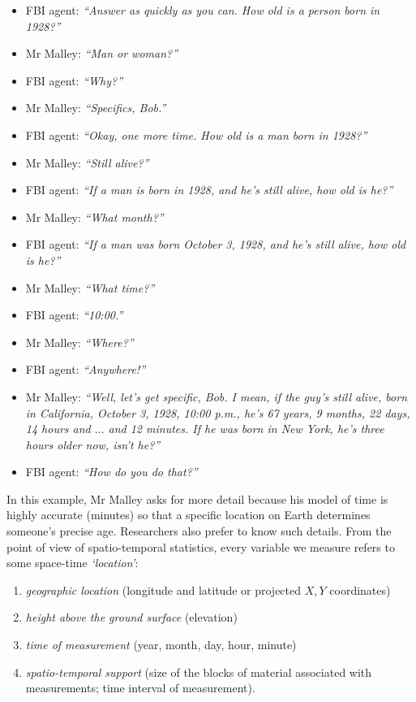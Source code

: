 \documentclass[graybox,envcountchap,sectrefs,UStrade]{svmono}
\begin{document}
\begin{itemize}\renewcommand{\labelitemi}{$\blacktriangleright$}
  \item FBI agent: \emph{``Answer as quickly as you can. How old is a person born in 1928?''}
  \item Mr Malley: \emph{``Man or woman?''}
  \item FBI agent: \emph{``Why?''}
  \item Mr Malley: \emph{``Specifics, Bob.''}
  \item FBI agent: \emph{``Okay, one more time. How old is a man born in 1928?''}
  \item Mr Malley: \emph{``Still alive?''}
  \item FBI agent: \emph{``If a man is born in 1928, and he's still alive, how old is he?''}
  \item Mr Malley: \emph{``What month?''}
  \item FBI agent: \emph{``If a man was born October 3, 1928, and he's still alive, how old is he?''}
  \item Mr Malley: \emph{``What time?''}
  \item FBI agent: \emph{``10:00.''}
  \item Mr Malley: \emph{``Where?''}
  \item FBI agent: \emph{``Anywhere!''}
  \item Mr Malley: \emph{``Well, let's get specific, Bob. I mean, if the guy's still alive, born in California, October 3, 1928, 10:00 p.m., he's 67 years, 9 months, 22 days, 14 hours and $\ldots$ and 12 minutes. If he was born in New York, he's three hours older now, isn't he?''}
  \item FBI agent: \emph{``How do you do that?''}
\end{itemize}

In this example, Mr Malley asks for more detail because his model of time is highly accurate (minutes) so that a specific location on Earth determines someone's precise age. Researchers also prefer to know such details. From the point of view of spatio-temporal statistics, every variable we measure refers to some space-time \emph{`location'}:

\begin{enumerate}
  \item \emph{geographic location} (longitude and latitude or projected $X,Y$ coordinates)
  \item \emph{height above the ground surface} (elevation)
  \item \emph{time of measurement} (year, month, day, hour, minute)
  \item \emph{spatio-temporal support} (size of the blocks of material associated with measurements; time interval of measurement).
\end{enumerate}
\end{document}
